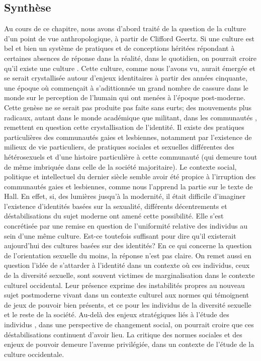 \subsection{Synthèse}
\label{sec:synth_se}
Au cours de ce chapitre, nous avons d'abord traité de la question de la culture d'un point de vue anthropologique, à partir de Clifford Geertz.
Si une culture est bel et bien un système de pratiques et de conceptions héritées répondant à certaines absences de réponse dans la réalité, dans le quotidien, on pourrait croire qu'il existe une culture \lgbt{}.
Cette culture, comme nous l'avons vu, aurait émergée  et se serait crystallisée autour d'enjeux identitaires à partir des années cinquante, une époque où commençait à s'adittionnée un grand nombre de cassure dans le monde sur le perception de l'humain qui ont menées à l'époque post-moderne.
Cette genèse ne se serait pas produite pas faite sans eurts; des mouvements plus radicaux, autant dans le monde académique que militant, dans les communautés \lgbt, remettent en question cette crystallisation de l'identité.
Il existe des pratiques particulières des communautés gaies et lesbiennes, notamment par l'existence de milieux de vie particuliers, de pratiques sociales et sexuelles différentes des hétérosexuels et d'une histoire particulière à cette communauté (qui demeure tout de même imbriquée dans celle de la société majoritaire).
Le contexte social, politique et intellectuel du dernier siècle semble avoir été propice à l'irruption des communautés gaies et lesbiennes, comme nous l'apprend la partie sur le texte de Hall.
En effet, si, des lumières jusqu'à la modernité, il était difficile d'imaginer l'existence d'identités basées sur la sexualité, différents décentrements et déstabilisations du sujet moderne ont amené cette possibilité.
Elle s'est concrétisée par une remise en question de l'uniformité relative des individus au sein d'une même culture.
Est-ce toutefois suffisant pour dire qu'il existerait aujourd'hui des cultures basées sur des identités?
En ce qui concerne la question de l'orientation sexuelle du moins, la réponse n'est pas claire.
On remet aussi en question l'idée de s'attarder à l'identité dans un contexte où ces individus, ceux de la diversité sexuelle, sont souvent victimes de marginalisation dans le contexte culturel occidental.
Leur présence exprime des instabilités propres au nouveau sujet postmoderne vivant dans un contexte culturel aux normes qui témoignent de jeux de pouvoir bien présents, et ce pour les individus de la diversité sexuelle et le reste de la société.
Au-delà des enjeux stratégiques liés à l'étude des individus \lgbt{}, dans une perspective de changement social, on pourrait croire que ces déstabilisations continuent d'avoir lieu.
La critique des normes sociales et des enjeux de pouvoir demeure l'avenue privilégiée, dans un contexte de l'étude de la culture occidentale.

